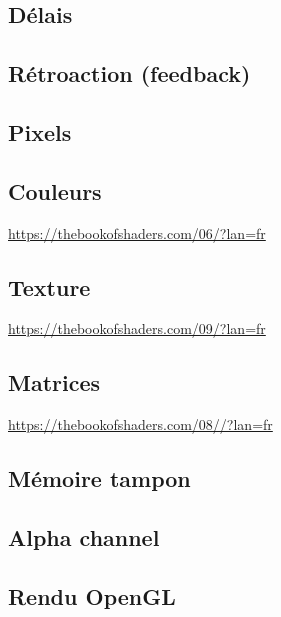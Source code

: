 \documentclass[
]{book}
\begin{document}
\hypertarget{duxe9lais}{%
\subsection{Délais}\label{duxe9lais}}

\hypertarget{ruxe9troaction-feedback}{%
\subsection{Rétroaction (feedback)}\label{ruxe9troaction-feedback}}

\hypertarget{pixels}{%
\subsection{Pixels}\label{pixels}}

\hypertarget{couleurs}{%
\subsection{Couleurs}\label{couleurs}}

\url{https://thebookofshaders.com/06/?lan=fr}

\hypertarget{texture}{%
\subsection{Texture}\label{texture}}

\url{https://thebookofshaders.com/09/?lan=fr}

\hypertarget{matrices}{%
\subsection{Matrices}\label{matrices}}

\url{https://thebookofshaders.com/08//?lan=fr}

\hypertarget{muxe9moire-tampon}{%
\subsection{Mémoire tampon}\label{muxe9moire-tampon}}

\hypertarget{alpha-channel}{%
\subsection{Alpha channel}\label{alpha-channel}}

\hypertarget{rendu-opengl}{%
\subsection{Rendu OpenGL}\label{rendu-opengl}}
\end{document}

